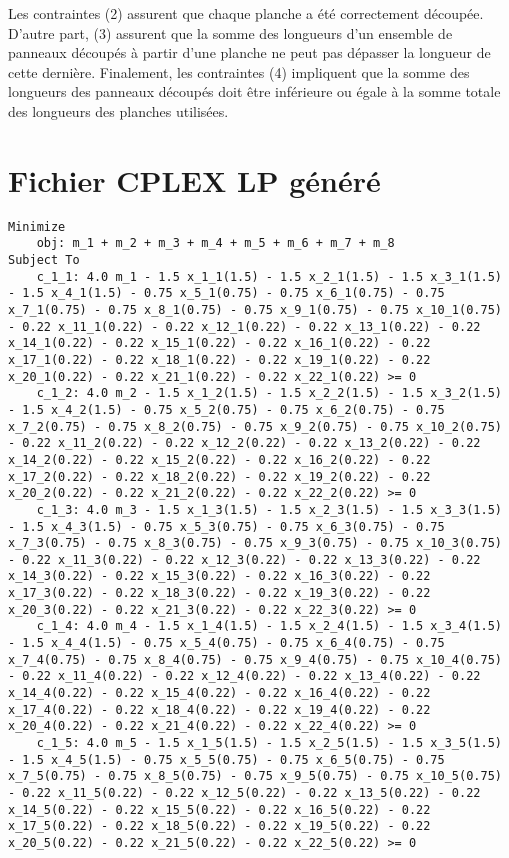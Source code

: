 \documentclass{article}[A4]
\begin{document}
Les contraintes (2) assurent que chaque planche a été correctement 
découpée. D'autre part, (3) assurent que la somme des longueurs d'un 
ensemble de panneaux découpés à partir d'une planche ne peut pas 
dépasser la longueur de cette dernière. Finalement, les contraintes (4)
impliquent que la somme des longueurs des panneaux découpés doit être
inférieure ou égale à la somme totale des longueurs des planches utilisées.

\section{Fichier CPLEX LP généré}
\begin{lstlisting}
Minimize
	obj: m_1 + m_2 + m_3 + m_4 + m_5 + m_6 + m_7 + m_8
Subject To
	c_1_1: 4.0 m_1 - 1.5 x_1_1(1.5) - 1.5 x_2_1(1.5) - 1.5 x_3_1(1.5) - 1.5 x_4_1(1.5) - 0.75 x_5_1(0.75) - 0.75 x_6_1(0.75) - 0.75 x_7_1(0.75) - 0.75 x_8_1(0.75) - 0.75 x_9_1(0.75) - 0.75 x_10_1(0.75) - 0.22 x_11_1(0.22) - 0.22 x_12_1(0.22) - 0.22 x_13_1(0.22) - 0.22 x_14_1(0.22) - 0.22 x_15_1(0.22) - 0.22 x_16_1(0.22) - 0.22 x_17_1(0.22) - 0.22 x_18_1(0.22) - 0.22 x_19_1(0.22) - 0.22 x_20_1(0.22) - 0.22 x_21_1(0.22) - 0.22 x_22_1(0.22) >= 0
	c_1_2: 4.0 m_2 - 1.5 x_1_2(1.5) - 1.5 x_2_2(1.5) - 1.5 x_3_2(1.5) - 1.5 x_4_2(1.5) - 0.75 x_5_2(0.75) - 0.75 x_6_2(0.75) - 0.75 x_7_2(0.75) - 0.75 x_8_2(0.75) - 0.75 x_9_2(0.75) - 0.75 x_10_2(0.75) - 0.22 x_11_2(0.22) - 0.22 x_12_2(0.22) - 0.22 x_13_2(0.22) - 0.22 x_14_2(0.22) - 0.22 x_15_2(0.22) - 0.22 x_16_2(0.22) - 0.22 x_17_2(0.22) - 0.22 x_18_2(0.22) - 0.22 x_19_2(0.22) - 0.22 x_20_2(0.22) - 0.22 x_21_2(0.22) - 0.22 x_22_2(0.22) >= 0
	c_1_3: 4.0 m_3 - 1.5 x_1_3(1.5) - 1.5 x_2_3(1.5) - 1.5 x_3_3(1.5) - 1.5 x_4_3(1.5) - 0.75 x_5_3(0.75) - 0.75 x_6_3(0.75) - 0.75 x_7_3(0.75) - 0.75 x_8_3(0.75) - 0.75 x_9_3(0.75) - 0.75 x_10_3(0.75) - 0.22 x_11_3(0.22) - 0.22 x_12_3(0.22) - 0.22 x_13_3(0.22) - 0.22 x_14_3(0.22) - 0.22 x_15_3(0.22) - 0.22 x_16_3(0.22) - 0.22 x_17_3(0.22) - 0.22 x_18_3(0.22) - 0.22 x_19_3(0.22) - 0.22 x_20_3(0.22) - 0.22 x_21_3(0.22) - 0.22 x_22_3(0.22) >= 0
	c_1_4: 4.0 m_4 - 1.5 x_1_4(1.5) - 1.5 x_2_4(1.5) - 1.5 x_3_4(1.5) - 1.5 x_4_4(1.5) - 0.75 x_5_4(0.75) - 0.75 x_6_4(0.75) - 0.75 x_7_4(0.75) - 0.75 x_8_4(0.75) - 0.75 x_9_4(0.75) - 0.75 x_10_4(0.75) - 0.22 x_11_4(0.22) - 0.22 x_12_4(0.22) - 0.22 x_13_4(0.22) - 0.22 x_14_4(0.22) - 0.22 x_15_4(0.22) - 0.22 x_16_4(0.22) - 0.22 x_17_4(0.22) - 0.22 x_18_4(0.22) - 0.22 x_19_4(0.22) - 0.22 x_20_4(0.22) - 0.22 x_21_4(0.22) - 0.22 x_22_4(0.22) >= 0
	c_1_5: 4.0 m_5 - 1.5 x_1_5(1.5) - 1.5 x_2_5(1.5) - 1.5 x_3_5(1.5) - 1.5 x_4_5(1.5) - 0.75 x_5_5(0.75) - 0.75 x_6_5(0.75) - 0.75 x_7_5(0.75) - 0.75 x_8_5(0.75) - 0.75 x_9_5(0.75) - 0.75 x_10_5(0.75) - 0.22 x_11_5(0.22) - 0.22 x_12_5(0.22) - 0.22 x_13_5(0.22) - 0.22 x_14_5(0.22) - 0.22 x_15_5(0.22) - 0.22 x_16_5(0.22) - 0.22 x_17_5(0.22) - 0.22 x_18_5(0.22) - 0.22 x_19_5(0.22) - 0.22 x_20_5(0.22) - 0.22 x_21_5(0.22) - 0.22 x_22_5(0.22) >= 0

\end{lstlisting}
\end{document}

